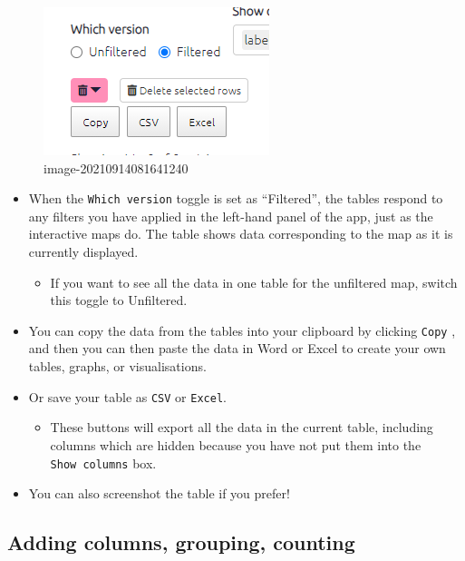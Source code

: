 \documentclass[
]{book}
\providecommand{\tightlist}{%
  \setlength{\itemsep}{0pt}\setlength{\parskip}{0pt}}
\begin{document}
\begin{figure}
\centering
\includegraphics{_assets/image-20210914081641240.png}
\caption{image-20210914081641240}
\end{figure}

\begin{itemize}
\tightlist
\item
  When the \texttt{Which\ version} toggle is set as ``Filtered'', the tables respond to any filters you have applied in the left-hand panel of the app, just as the interactive maps do. The table shows data corresponding to the map as it is currently displayed.

  \begin{itemize}
  \tightlist
  \item
    If you want to see all the data in one table for the unfiltered map, switch this toggle to Unfiltered.
  \end{itemize}
\item
  You can copy the data from the tables into your clipboard by clicking \texttt{Copy} , and then you can then paste the data in Word or Excel to create your own tables, graphs, or visualisations.
\item
  Or save your table as \texttt{CSV} or \texttt{Excel}.

  \begin{itemize}
  \tightlist
  \item
    These buttons will export all the data in the current table, including columns which are hidden because you have not put them into the \texttt{Show\ columns} box.
  \end{itemize}
\item
  You can also screenshot the table if you prefer!
\end{itemize}

\hypertarget{adding-columns-grouping-counting}{%
\subsection{Adding columns, grouping, counting}\label{adding-columns-grouping-counting}}
\end{document}
